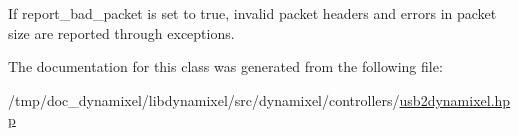 If report\+\_\+bad\+\_\+packet is set to true, invalid packet headers and errors in packet size are reported through exceptions. 

The documentation for this class was generated from the following file\+:\begin{DoxyCompactItemize}
\item 
/tmp/doc\+\_\+dynamixel/libdynamixel/src/dynamixel/controllers/\hyperlink{usb2dynamixel_8hpp}{usb2dynamixel.\+hpp}\end{DoxyCompactItemize}
